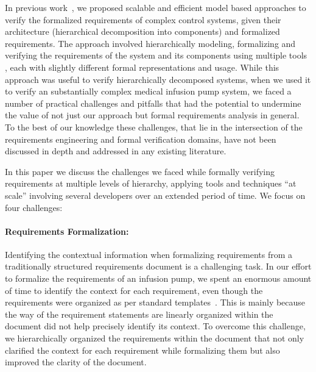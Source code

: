 In previous work~\cite{hilt2013, req2code, ICCPS2014}, we proposed scalable and efficient model based approaches to verify the formalized requirements of complex control systems, given their architecture (hierarchical decomposition into components) and formalized requirements. The approach involved hierarchically modeling, formalizing and verifying the requirements of the system and its components using multiple tools%
, each with slightly different formal representations and usage. While this approach was useful to verify hierarchically decomposed systems, when we used it to verify an substantially complex medical infusion pump system, we faced a number of practical challenges and pitfalls that had the potential to undermine the value of not just our approach but formal requirements analysis in general. To the best of our knowledge these challenges, that lie in the intersection of the requirements engineering and formal verification domains, have not been discussed in depth and addressed in any existing literature.

In this paper we discuss the challenges we faced while formally verifying requirements at multiple levels of hierarchy, applying tools and techniques ``at scale'' involving several developers over an extended period of time.  We focus on four challenges:
\vspace{-0.15in}
\paragraph{\textbf{Requirements Formalization:}} Identifying the contextual information when formalizing requirements from a traditionally structured requirements document is a challenging task. In our effort to formalize the requirements of an infusion pump, we spent an enormous amount of time to identify the context for each requirement, even though the requirements were organized as per standard templates~\cite{IEEESRS}. This is mainly because the way of the requirement statements are linearly organized within the document did not help precisely identify its context. To overcome this challenge, we hierarchically organized the requirements within the document that not only clarified the context for each requirement while formalizing them but also improved the clarity of the document.
\vspace{-0.15in}
